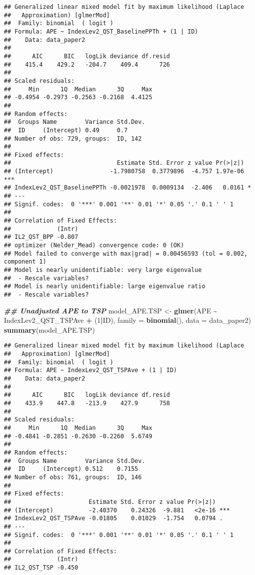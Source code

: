 \documentclass[
  12pt,
]{article}
\newenvironment{Shaded}{\begin{snugshade}}{\end{snugshade}}
\newcommand{\AttributeTok}[1]{\textcolor[rgb]{0.13,0.29,0.53}{#1}}
\newcommand{\DecValTok}[1]{\textcolor[rgb]{0.00,0.00,0.81}{#1}}
\newcommand{\DocumentationTok}[1]{\textcolor[rgb]{0.56,0.35,0.01}{\textbf{\textit{#1}}}}
\newcommand{\FunctionTok}[1]{\textcolor[rgb]{0.13,0.29,0.53}{\textbf{#1}}}
\newcommand{\NormalTok}[1]{#1}
\newcommand{\OtherTok}[1]{\textcolor[rgb]{0.56,0.35,0.01}{#1}}
\newcommand{\SpecialCharTok}[1]{\textcolor[rgb]{0.81,0.36,0.00}{\textbf{#1}}}
\begin{document}
\begin{verbatim}
## Generalized linear mixed model fit by maximum likelihood (Laplace
##   Approximation) [glmerMod]
##  Family: binomial  ( logit )
## Formula: APE ~ IndexLev2_QST_BaselinePPTh + (1 | ID)
##    Data: data_paper2
## 
##      AIC      BIC   logLik deviance df.resid 
##    415.4    429.2   -204.7    409.4      726 
## 
## Scaled residuals: 
##     Min      1Q  Median      3Q     Max 
## -0.4954 -0.2973 -0.2563 -0.2168  4.4125 
## 
## Random effects:
##  Groups Name        Variance Std.Dev.
##  ID     (Intercept) 0.49     0.7     
## Number of obs: 729, groups:  ID, 142
## 
## Fixed effects:
##                              Estimate Std. Error z value Pr(>|z|)    
## (Intercept)                -1.7980758  0.3779896  -4.757 1.97e-06 ***
## IndexLev2_QST_BaselinePPTh -0.0021978  0.0009134  -2.406   0.0161 *  
## ---
## Signif. codes:  0 '***' 0.001 '**' 0.01 '*' 0.05 '.' 0.1 ' ' 1
## 
## Correlation of Fixed Effects:
##             (Intr)
## IL2_QST_BPP -0.807
## optimizer (Nelder_Mead) convergence code: 0 (OK)
## Model failed to converge with max|grad| = 0.00456593 (tol = 0.002, component 1)
## Model is nearly unidentifiable: very large eigenvalue
##  - Rescale variables?
## Model is nearly unidentifiable: large eigenvalue ratio
##  - Rescale variables?
\end{verbatim}

\begin{Shaded}
\begin{Highlighting}[]
\DocumentationTok{\#\# Unadjusted APE to TSP}
\NormalTok{model\_APE.TSP }\OtherTok{\textless{}{-}} \FunctionTok{glmer}\NormalTok{(APE }\SpecialCharTok{\textasciitilde{}}\NormalTok{ IndexLev2\_QST\_TSPAve }\SpecialCharTok{+}\NormalTok{ (}\DecValTok{1}\SpecialCharTok{|}\NormalTok{ID), }\AttributeTok{family =} \FunctionTok{binomial}\NormalTok{(), }\AttributeTok{data =}\NormalTok{ data\_paper2)}
\FunctionTok{summary}\NormalTok{(model\_APE.TSP)}
\end{Highlighting}
\end{Shaded}

\begin{verbatim}
## Generalized linear mixed model fit by maximum likelihood (Laplace
##   Approximation) [glmerMod]
##  Family: binomial  ( logit )
## Formula: APE ~ IndexLev2_QST_TSPAve + (1 | ID)
##    Data: data_paper2
## 
##      AIC      BIC   logLik deviance df.resid 
##    433.9    447.8   -213.9    427.9      758 
## 
## Scaled residuals: 
##     Min      1Q  Median      3Q     Max 
## -0.4841 -0.2851 -0.2630 -0.2260  5.6749 
## 
## Random effects:
##  Groups Name        Variance Std.Dev.
##  ID     (Intercept) 0.512    0.7155  
## Number of obs: 761, groups:  ID, 146
## 
## Fixed effects:
##                      Estimate Std. Error z value Pr(>|z|)    
## (Intercept)          -2.40370    0.24326  -9.881   <2e-16 ***
## IndexLev2_QST_TSPAve -0.01805    0.01029  -1.754   0.0794 .  
## ---
## Signif. codes:  0 '***' 0.001 '**' 0.01 '*' 0.05 '.' 0.1 ' ' 1
## 
## Correlation of Fixed Effects:
##             (Intr)
## IL2_QST_TSP -0.450
\end{verbatim}
\end{document}

